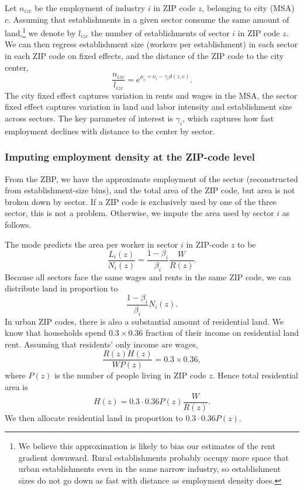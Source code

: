 \documentclass[12pt]{article}
\begin{document}
Let $n_{izc}$ be the employment of industry $i$ in ZIP code $z$, belonging to city (MSA) $c$.  Assuming that establishments in a given sector consume the same amount of land,\footnote{We believe this approximation is likely to bias our estimates of the rent gradient downward. Rural establishments probably occupy more space that urban establishments even in the same narrow industry, so establishment sizes do not go down as fast with distance as employment density does. } we denote by $l_{izc}$ the number of establishments of sector $i$ in ZIP code $z$. We can then regress establishment size (workers per establishment) in each sector in each ZIP code on fixed effects, and the distance of the ZIP code to the city center,
\begin{equation}\label{eq:estimable:gradient}
\frac{n_{izc}}{l_{izc}} = e^{\mu_c+\nu_i-\gamma_i d(z,c)}.
\end{equation}
The city fixed effect captures variation in rents and wages in the MSA, the sector fixed effect captures variation in land and labor intensity and establishment size across sectors. %
The key parameter of interest is $\gamma_i$, which captures how fast employment declines with distance to the center by sector.

\subsubsection{Imputing employment density at the ZIP-code level}
From the ZBP, we have the approximate employment of the sector (reconstructed from establishment-size bins), and the total area of the ZIP code, but area is not broken down by sector. If a ZIP code is exclusively used by one of the three sector, this is not a problem. Otherwise, we impute the area used by sector $i$ as follows.

The mode predicts the area per worker in sector $i$ in ZIP-code $z$ to be
\[
\frac{L_i(z)}{N_i(z)} = \frac{1-\beta_i}{\beta_i}\frac{W}{R(z)}.
\]
Because all sectors face the same wages and rents in the same ZIP code, we can distribute land in proportion to
\[
\frac{1-\beta_i}{\beta_i}N_i(z).
\]
In urban ZIP codes, there is also a substantial amount of residential land. We know that households spend $0.3\times 0.36$ fraction of their income on residential land rent. Assuming that residents' only income are wages,
\[
\frac{R(z)H(z)}{WP(z)} = 0.3\times 0.36,
\]
where $P(z)$ is the number of people living in ZIP code $z$. Hence total residential area is
\[
H(z) = 0.3\cdot0.36 P(z) \frac{W}{R(z)}.
\]
We then allocate residential land in proportion to $0.3\cdot0.36 P(z)$.
\end{document}
